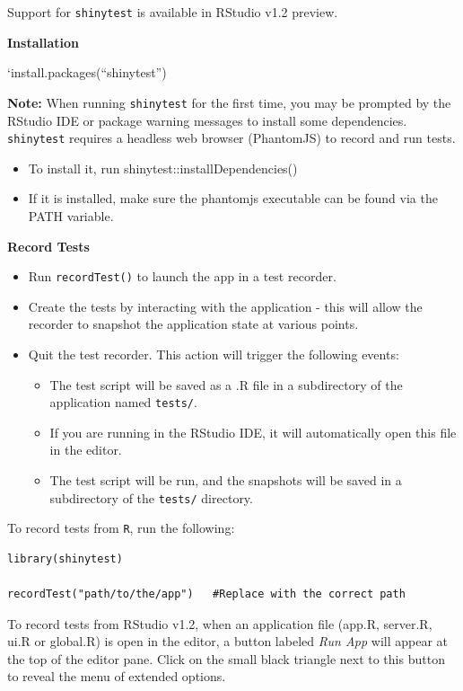 \documentclass[]{book}
\providecommand{\tightlist}{%
  \setlength{\itemsep}{0pt}\setlength{\parskip}{0pt}}
\theoremstyle{definition}
\theoremstyle{definition}
\theoremstyle{definition}
\theoremstyle{remark}
\begin{document}
Support for \texttt{shinytest} is available in RStudio v1.2 preview.

\textbf{Installation}

`install.packages(``shinytest'')

\textbf{Note:} When running \texttt{shinytest} for the first time, you
may be prompted by the RStudio IDE or package warning messages to
install some dependencies. \texttt{shinytest} requires a headless web
browser (PhantomJS) to record and run tests.

\begin{itemize}
\tightlist
\item
  To install it, run shinytest::installDependencies()
\item
  If it is installed, make sure the phantomjs executable can be found
  via the PATH variable.
\end{itemize}

\textbf{Record Tests}

\begin{itemize}
\tightlist
\item
  Run \texttt{recordTest()} to launch the app in a test recorder.
\item
  Create the tests by interacting with the application - this will allow
  the recorder to snapshot the application state at various points.
\item
  Quit the test recorder. This action will trigger the following events:

  \begin{itemize}
  \tightlist
  \item
    The test script will be saved as a .R file in a subdirectory of the
    application named \texttt{tests/}.
  \item
    If you are running in the RStudio IDE, it will automatically open
    this file in the editor.
  \item
    The test script will be run, and the snapshots will be saved in a
    subdirectory of the \texttt{tests/} directory.
  \end{itemize}
\end{itemize}

To record tests from \texttt{R}, run the following:

\begin{verbatim}
library(shinytest)

recordTest("path/to/the/app")   #Replace with the correct path
\end{verbatim}

To record tests from RStudio v1.2, when an application file (app.R,
server.R, ui.R or global.R) is open in the editor, a button labeled
\emph{Run App} will appear at the top of the editor pane. Click on the
small black triangle next to this button to reveal the menu of extended
options.
\end{document}
